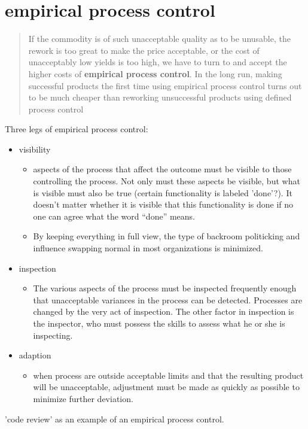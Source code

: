 \section{empirical process control} 

\begin{quotation}
  If the commodity is of such unacceptable
  quality as to be unusable, the rework is too great to make the price acceptable,
  or the cost of unacceptably low yields is too high, we have to turn to and accept
  the higher costs of \textbf{empirical process control}.
  In the long run, making successful
  products the first time using empirical process control turns out to be much
  cheaper than reworking unsuccessful products using defined process control
\end{quotation}

Three legs of empirical process control:
\begin{itemize}
  \item visibility
  \begin{itemize}
    \item aspects of the process that affect the outcome must be visible to those controlling the process. Not only must these aspects be visible, but what is visible must also be true (certain functionality is labeled 'done'?). It doesn’t matter whether it is visible that this functionality is done if no one can agree what the word “done” means.
    \item By keeping everything in full view, the type of backroom politicking and influence swapping normal in most organizations is minimized.
  \end{itemize}
  \item inspection
  \begin{itemize}
    \item The various aspects of the process must be
    inspected frequently enough that unacceptable variances in the process can be
    detected. Processes are changed by the very act of inspection. The other factor in
    inspection is the inspector, who must possess the skills to assess what he or she
    is inspecting.
  \end{itemize}
  \item adaption
  \begin{itemize}
    \item when process are outside acceptable limits and that the resulting product will be unacceptable, adjustment
    must be made as quickly as possible to minimize further deviation.
  \end{itemize}
\end{itemize}

'code review' as an example of an empirical process control.